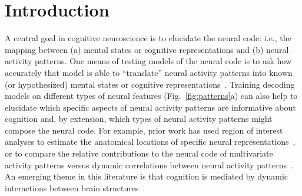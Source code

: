 \documentclass[english]{article}
\begin{document}
\section*{Introduction}
A central goal in cognitive neuroscience is to elucidate the
neural code: i.e., the mapping between (a) mental states or
cognitive representations and (b) neural activity patterns. One means
of testing models of the neural code is to ask how accurately that
model is able to ``translate'' neural activity patterns into known (or
hypothesized) mental states or cognitive
representations~\cite{HaxbEtal01, NormEtal06b, TongPrat12,
  MitcEtal08a, KamiTong05, NishEtal11, PereEtal18, HuthEtal12,
  HuthEtal16}.  Training decoding models on different types of neural
features (Fig.~\ref{fig:patterns}a) can also help to elucidate which
specific aspects of neural activity patterns are informative about
cognition and, by extension, which types of neural activity patterns
might compose the neural code.  For example, prior work has used
region of interest analyses to estimate the anatomical locations of
specific neural representations~\cite{EtzeEtal09}, or to
compare the relative contributions to the neural code of multivariate
activity patterns versus dynamic correlations between neural activity
patterns~\cite{MannEtal18, FongEtal19}.  An emerging theme
in this literature is that cognition is mediated by dynamic
interactions between brain structures~\cite{Gros88, Fris00, SporHone06, BassEtal06,
  Turk13, DemeEtal19, SoloEtal19, LuriEtal18, PretEtal17, ZouEtal19,
  MackEtal17, BresKels01, McIn00}.
\end{document}
